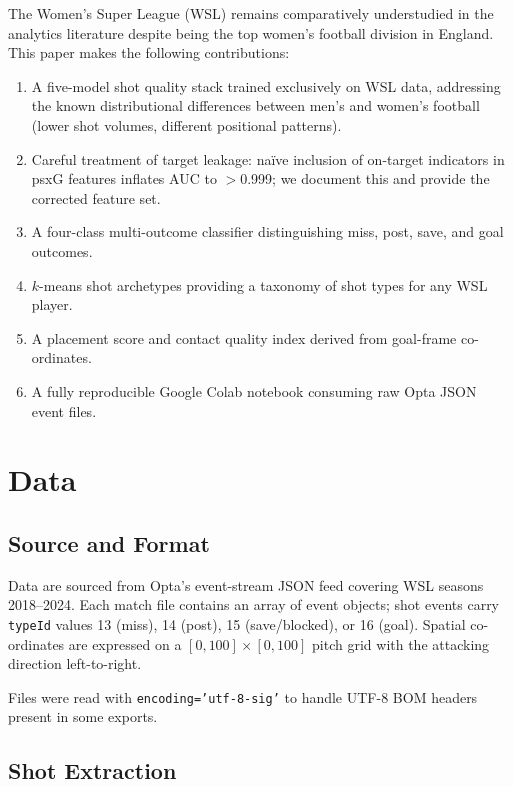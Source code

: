 \documentclass[12pt,a4paper]{article}
\begin{document}
The Women's Super League (WSL) remains comparatively understudied in the analytics literature despite being the top women's football division in England. This paper makes the following contributions:

\begin{enumerate}
    \item A five-model shot quality stack trained exclusively on WSL data, addressing the known distributional differences between men's and women's football (lower shot volumes, different positional patterns).
    \item Careful treatment of target leakage: na\"{i}ve inclusion of on-target indicators in psxG features inflates AUC to $>$0.999; we document this and provide the corrected feature set.
    \item A four-class multi-outcome classifier distinguishing miss, post, save, and goal outcomes.
    \item $k$-means shot archetypes providing a taxonomy of shot types for any WSL player.
    \item A placement score and contact quality index derived from goal-frame co-ordinates.
    \item A fully reproducible Google Colab notebook consuming raw Opta JSON event files.
\end{enumerate}

\section{Data}
\label{sec:data}

\subsection{Source and Format}

Data are sourced from Opta's event-stream JSON feed covering WSL seasons 2018–2024. Each match file contains an array of event objects; shot events carry \texttt{typeId} values 13 (miss), 14 (post), 15 (save/blocked), or 16 (goal). Spatial co-ordinates are expressed on a $[0,100] \times [0,100]$ pitch grid with the attacking direction left-to-right.

Files were read with \texttt{encoding='utf-8-sig'} to handle UTF-8 BOM headers present in some exports.

\subsection{Shot Extraction}
\end{document}

